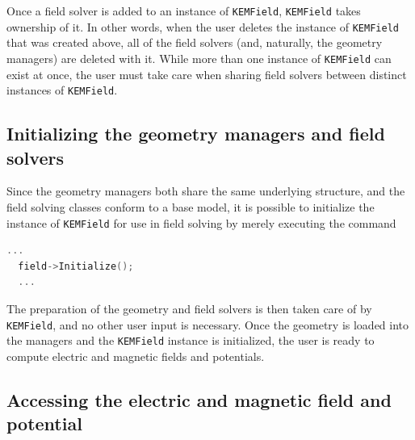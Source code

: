 \documentclass[11pt,a4paper,oneside]{article}
\begin{document}
%
Once a field solver is added to an instance of \texttt{KEMField}, \texttt{KEMField} takes ownership of it.  In other words, when the user deletes the instance of \texttt{KEMField} that was created above, all of the field solvers (and, naturally, the geometry managers) are deleted with it.  While more than one instance of \texttt{KEMField} can exist at once, the user must take care when sharing field solvers between distinct instances of \texttt{KEMField}.  

\subsection{Initializing the geometry managers and field solvers}
\label{subsec:initializing}

Since the geometry managers both share the same underlying structure, and the field solving classes conform to a base model, it is possible to initialize the instance of \texttt{KEMField} for use in field solving by merely executing the command 
%
\begin{lstlisting}[language=C++]
  ...
  field->Initialize();
  ...
\end{lstlisting}
%
The preparation of the geometry and field solvers is then taken care of by \texttt{KEMField}, and no other user input is necessary.  Once the geometry is loaded into the managers and the \texttt{KEMField} instance is initialized, the user is ready to compute electric and magnetic fields and potentials.  

\subsection{Accessing the electric and magnetic field and potential}
\label{subsec:accessing}
\end{document}
